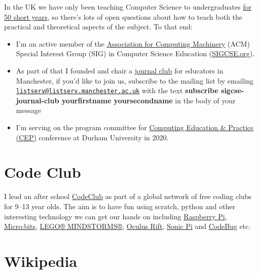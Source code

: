 \documentclass[12pt,]{book}
\providecommand{\tightlist}{%
  \setlength{\itemsep}{0pt}\setlength{\parskip}{0pt}}
\begin{document}
In the UK we have only been teaching Computer Science to undergraduates \href{http://www.bbc.co.uk/manchester/content/articles/2005/11/07/baby_computer_40_interview_feature.shtml}{for 50 short years}, so there's lots of open questions about how to teach both the practical and theoretical aspects of the subject. To that end:

\begin{itemize}
\tightlist
\item
  I'm an active member of the \href{https://en.wikipedia.org/wiki/Association_for_Computing_Machinery}{Association for Computing Machinery} (ACM) Special Interest Group (SIG) in Computer Science Education (\href{https://sigcse.org}{SIGCSE.org}).
\item
  As part of that I founded and chair a \href{https://duncan.hull.name/2019/07/17/sigcse-journal-club/}{journal club} for educators in Manchester, if you'd like to join us, subscribe to the mailing list by emailing \href{mailto:listserv@listserv.manchester.ac.uk}{\nolinkurl{listserv@listserv.manchester.ac.uk}} with the text \textbf{subscribe sigcse-journal-club yourfirstname yoursecondname} in the body of your message
\item
  I'm serving on the program committee for \href{http://community.dur.ac.uk/cep.conference}{Computing Education \& Practice (CEP)} conference at Durham University in 2020.
\end{itemize}

\hypertarget{code-club}{%
\section{Code Club}\label{code-club}}

I lead an after school \href{https://codeclub.org}{CodeClub} as part of a global network of free coding clubs for 9--13 year olds. The aim is to have fun using scratch, python and other interesting technology we can get our hands on including \href{https://www.raspberrypi.org/}{Raspberry Pi}, \href{https://microbit.org/}{Micro:bits}, \href{https://www.lego.com/en-gb/themes/mindstorms}{LEGO® MINDSTORMS®}, \href{https://www.oculus.com}{Oculus Rift}, \href{https://sonic-pi.net/}{Sonic Pi} and \href{http://www.codebug.org.uk/}{CodeBug} etc.

\hypertarget{wikipedia}{%
\section{Wikipedia}\label{wikipedia}}
\end{document}
